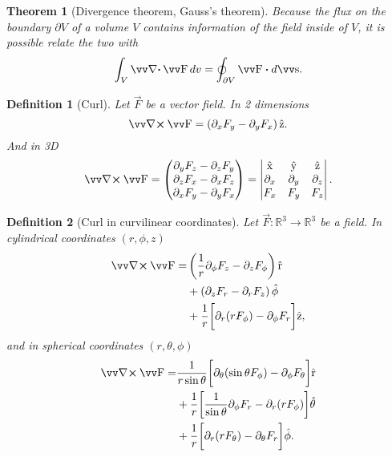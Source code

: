 \documentclass[margin=normal]{tex/hsrzf}
\theoremstyle{elmagzf}
\newtheorem{theorem}{Theorem}
\newtheorem{definition}{Definition}
\begin{document}
\begin{theorem}[Divergence theorem, Gauss's theorem]
  Because the flux on the boundary \(\partial V\) of a volume \(V\) contains
  information of the field inside of \(V\), it is possible relate the two with
  \[
    \int_V \div \vec{F} \,dv = \oint_{\partial V} \vec{F} \dotp d\vec{s} .
  \]
\end{theorem}

\begin{definition}[Curl]
  Let \(\vec{F}\) be a vector field. In 2 dimensions
  \[
    \curl \vec{F} = \left(\partial_x F_y - \partial_y F_x\right)\uvec{z}.
  \]
  And in 3D
  \[
    \curl \vec{F} = \begin{pmatrix}
      \partial_y F_z - \partial_z F_y \\
      \partial_z F_x - \partial_x F_z \\
      \partial_x F_y - \partial_y F_x
    \end{pmatrix}
    = \begin{vmatrix}
      \uvec{x} & \uvec{y} & \uvec{z} \\
      \partial_x & \partial_y & \partial_z \\
      F_x & F_y & F_z
    \end{vmatrix} .
  \]
\end{definition}

\begin{definition}[Curl in curvilinear coordinates]
  Let \(\vec{F}: \mathbb{R}^3 \to \mathbb{R}^3\) be a field. In cylindrical
  coordinates \((r,\phi,z)\)
  \begin{align*}
    \curl \vec{F} =
      &\left(\frac{1}{r} \partial_\phi F_z - \partial_z F_\phi \right) \uvec{r} \\
      &+ \left(\partial_z F_r - \partial_r F_z \right) \uvec{\phi} \\
      &+ \frac{1}{r} \bigg[
        \partial_r (rF_\phi) - \partial_\phi F_r
        \bigg] \uvec{z},
  \end{align*}
  and in spherical coordinates \((r,\theta,\phi)\)
  \begin{align*}
      \curl \vec{F} =
        &\frac{1}{r \sin\theta} \bigg[
          \partial_\theta (\sin\theta F_\phi) - \partial_\phi F_\theta
        \bigg] \uvec{r} \\
        &+ \frac{1}{r} \bigg[
          \frac{1}{\sin\theta} \partial_\phi F_r - \partial_r (r F_\phi)
        \bigg] \uvec{\theta} \\
        &+ \frac{1}{r} \bigg[
          \partial_r (r F_\theta) - \partial_\theta F_r
        \bigg] \uvec{\phi} .
  \end{align*}
\end{definition}
\end{document}

